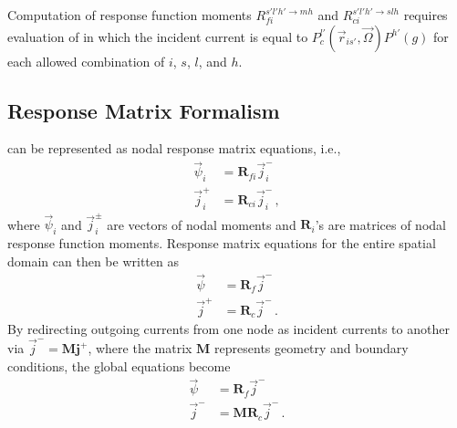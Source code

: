 Computation of response function moments $R^{s'l'h' \to mh}_{fi}$ and $R^{s'l'h' 
    \to slh}_{ci}$ requires evaluation of  in 
which the incident current is equal to $P^{l'}_c(\vec{r}_{is'}, \vec{\Omega}) 
P^{h'}(g)$ for each 
allowed combination of $i$, $s$, $l$, and $h$.

\subsection{Response Matrix Formalism}

 can be represented as 
nodal response matrix equations, i.e.,
\begin{equation}
    \begin{split}
        \vec{\psi}_i    &=  \mathbf{R}_{fi}  \vec{j}^-_i  \\ 
        \vec{j}^+_i &=  \mathbf{R}_{ci} \vec{j}^-_i  \, ,
    \end{split}
\end{equation}
where  $\vec{\psi}_i$ and $\vec{j}^{\pm}_i$ are vectors of nodal moments and 
$\mathbf{R}_i$'s are matrices of nodal response function moments. Response 
matrix equations for the entire spatial domain can then be written as
\begin{equation}
    \begin{split}
        \vec{\psi}    &= \mathbf{R}_{f} \vec{j}^-  \\
        \vec{j}^+ &= \mathbf{R}_{c}  \vec{j}^- \, .
    \end{split}
\end{equation}
By redirecting outgoing currents from one node as incident currents to another 
via $\vec{j}^- = \mathbf{Mj}^+$, where the matrix $\mathbf{M}$ represents 
geometry and boundary conditions, the global equations become
\begin{equation}
    \begin{split}
        \vec{\psi}    &= \mathbf{R}_{f}  \vec{j}^-  \\
        \vec{j}^- &= \mathbf{MR}_{c}   \vec{j}^- \, .
        \label{eq:globalrme}
    \end{split}
\end{equation}

